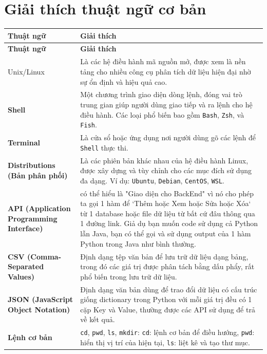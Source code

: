 \documentclass[11pt]{article}
\begin{document}
\section{Giải thích thuật ngữ cơ bản}
\begin{longtable}{>{\RaggedRight\bfseries}p{} >{\RaggedRight\arraybackslash}p{}}
\toprule
\textbf{Thuật ngữ} & \textbf{Giải thích} \\
\midrule
\endfirsthead %

\toprule
\textbf{Thuật ngữ} & \textbf{Giải thích} \\
\midrule
\endhead %

\bottomrule
\endfoot %

Unix/Linux & Là các hệ điều hành mã nguồn mở, được xem là nền tảng cho nhiều công cụ phân tích dữ liệu hiện đại nhờ sự ổn định và hiệu quả cao. \\
\midrule
Shell & Một chương trình giao diện dòng lệnh, đóng vai trò trung gian giúp người dùng giao tiếp và ra lệnh cho hệ điều hành. Các loại phổ biến bao gồm \texttt{Bash}, \texttt{Zsh}, và \texttt{Fish}. \\
\midrule
Terminal & Là cửa sổ hoặc ứng dụng nơi người dùng gõ các lệnh để \texttt{Shell} thực thi. \\
\midrule
Distributions (Bản phân phối) & Là các phiên bản khác nhau của hệ điều hành Linux, được xây dựng và tùy chỉnh cho các mục đích sử dụng đa dạng. Ví dụ: \texttt{Ubuntu}, \texttt{Debian}, \texttt{CentOS}, \texttt{WSL}. \\
\midrule
API (Application Programming Interface) & có thể hiểu là "Giao diện cho BackEnd" vì nó cho phép ta gọi 1 hàm để `Thêm hoặc Xem hoặc Sửa hoặc Xóa`  từ 1 database hoặc file dữ liệu từ bất cứ đâu thông qua 1 đường link. Giả dụ bạn muốn code sử dụng cả Python lẫn Java, bạn có thể gọi và sử dụng output của 1 hàm Python trong Java như bình thường. \\
\midrule
CSV (Comma-Separated Values) & Định dạng tệp văn bản để lưu trữ dữ liệu dạng bảng, trong đó các giá trị được phân tách bằng dấu phẩy, rất phổ biến trong lưu trữ dữ liệu. \\
\midrule
JSON (JavaScript Object Notation) & Định dạng văn bản dùng để trao đổi dữ liệu có cấu trúc giống dictionary trong Python với mỗi giá trị đều có 1 cặp Key và Value, thường được các API sử dụng để trả về kết quả. \\
\midrule
Lệnh cơ bản & \texttt{cd}, \texttt{pwd}, \texttt{ls}, \texttt{mkdir}: \texttt{cd}: lệnh cơ bản để điều hướng, \texttt{pwd}: hiển thị vị trí của hiện tại, \texttt{ls}: liệt kê và tạo thư mục. \\

\end{longtable}
\end{document}
